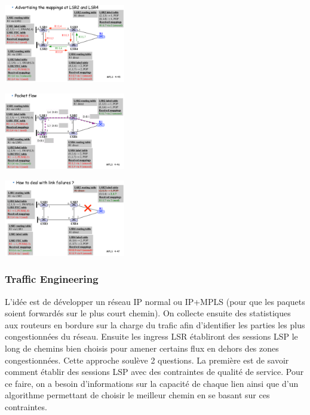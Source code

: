 \documentclass{article}
\begin{document}
\begin{sffamily}
    \begin{center}
    \includegraphics[width=200px]{img_018.pdf}
    \end{center}	

    \begin{center}
    \includegraphics[width=200px]{img_019.pdf}
    \end{center}	

\begin{center}
\includegraphics[width=200px]{img_020.pdf}
\end{center}	

\subsubsection*{Traffic Engineering}

L'idée est de développer un réseau IP normal ou IP+MPLS (pour que les paquets soient forwardés sur le plus court chemin). On
collecte ensuite des statistiques aux routeurs en bordure sur la charge du trafic afin d'identifier les parties les plus 
congestionnées du réseau. Ensuite les ingress LSR établiront des sessions LSP le long de chemins bien choisis pour amener 
certains flux en dehors des zones congestionnées. Cette approche soulève 2 questions. La première est de savoir comment établir
des sessions LSP avec des contraintes de qualité de service. Pour ce faire, on a besoin d'informations sur la capacité de 
chaque lien ainsi que d'un algorithme permettant de choisir le meilleur chemin en se basant sur ces contraintes. \\


\end{sffamily}
\end{document}
